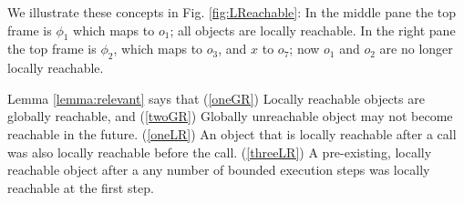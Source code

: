 We illustrate these concepts in Fig. \ref{fig:LReachable}: In the middle pane the top frame is $\phi_1$ which maps  to $o_1$; all objects are locally reachable. 
In the right pane the top frame is $\phi_2$, which maps  to $o_3$, and $x$ to $o_7$; now $o_1$ and $o_2$ are no longer locally reachable.

Lemma  \ref{lemma:relevant} %
says that  (\ref{oneGR}) Locally reachable objects are globally reachable, and 
(\ref{twoGR}) 
Globally unreachable object may not become reachable in the future.
(\ref{oneLR}) An object that is locally reachable after a call was also locally reachable before the call.
(\ref{threeLR}) A pre-existing, locally reachable  object after a any number of bounded execution steps was locally reachable at the first step.



